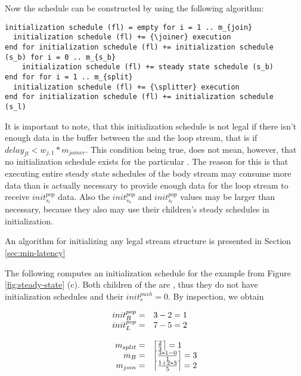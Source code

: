 Now the schedule can be constructed by using the following
algorithm:

\begin{singlespace}
\begin{verbatim}
initialization schedule (fl) = empty for i = 1 .. m_{join}
  initialization schedule (fl) += {\joiner} execution
end for initialization schedule (fl) += initialization schedule
(s_b) for i = 0 .. m_{s_b}
    initialization schedule (fl) += steady state schedule (s_b)
end for for i = 1 .. m_{split}
  initialization schedule (fl) += {\splitter} execution
end for initialization schedule (fl) += initialization schedule
(s_l)
\end{verbatim}
\end{singlespace}

It is important to note, that this initialization schedule is not
legal if there isn't enough data in the buffer between the {\joiner}
and the loop stream, that is if $delay_{fl} < w_{j,1} *
m_{joiner}$.  This condition being true, does not mean, however,
that no initialization schedule exists for the particular
{\feedbackloop}.  The reason for this is that executing entire
steady state schedules of the body stream may consume more data
than is actually necessary to provide enough data for the loop
stream to receive $init^{pop}_{s_l}$ data.  Also the
$init^{pop}_{s_b}$ and $init^{pop}_{s_l}$ values may be larger
than necessary, because they also may use their children's steady
schedules in initialization.

An algorithm for initializing any legal stream structure is
presented in Section \ref{sec:min-latency}

The following computes an initialization schedule for the example
{\feedbackloop} from Figure \ref{fig:steady-state} (c). Both
children of the {\feedbackloop} are {\filters}, thus they do not have
initialization schedules and their $init^{push}_{s} = 0$. By
inspection, we obtain

\begin{displaymath}
\begin{array}{rl}
init^{pop}_B = & 3-2 = 1 \\
init^{pop}_L = & 7-5 = 2 \\
\\
m_{split} = & \left\lceil 2 \over 3 \right\rceil = 1 \\
m_{B} = & \left\lceil 3 * 1 - 0 \over 1 \right\rceil = 3 \\
m_{join} = & \left\lceil 1 + 2 * 3 \over 5 \right\rceil = 2 \\
\end{array}
\end{displaymath}

